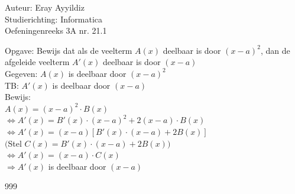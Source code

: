 \documentclass[a4paper]{article}
\begin{document}
  
\noindent \large Auteur: Eray Ayyildiz \\ 
\noindent \large Studierichting: Informatica \\ 
\noindent \large Oefeningenreeks 3A nr. 21.1 \\

\medskip

\normalsize

Opgave: Bewijs dat als de veelterm $A(x)$ deelbaar is door $(x - a)^{2}$, dan de afgeleide veelterm $A'(x)$ deelbaar is door $(x - a)$\\ 

Gegeven: $A(x)$ is deelbaar door $(x-a)^{2}$\\

TB: $A'(x)$ is deelbaar door $(x-a)$\\

Bewijs:\\

$A(x) = (x-a)^{2} \cdot B(x)$\\

$\Leftrightarrow A'(x) = B'(x) \cdot (x-a)^{2} + 2(x-a) \cdot B(x)$\\

$\Leftrightarrow A'(x) = (x-a) \left[ B'(x) \cdot (x-a) + 2B(x) \right]$\\

$($Stel $C(x) = B'(x) \cdot (x-a) + 2B(x) )$\\

$\Leftrightarrow A'(x) = (x-a) \cdot C(x)$\\

$\Rightarrow A'(x)$ is deelbaar door $(x-a)$



\begin{thebibliography}{999}
\end{thebibliography}
\end{document}
